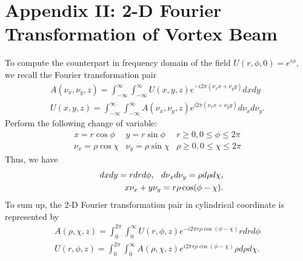 \section*{Appendix II: 2-D Fourier Transformation of Vortex Beam}
To compute the counterpart in frequency domain of the field $U(r, \phi, 0) = e^{i\phi}$, we recall the Fourier transformation pair
\begin{eqnarray}
	A(\nu_x, \nu_y, z) = \int_{-\infty}^{\infty} \int_{-\infty}^{\infty} U(x, y, z)
	e^{-i 2 \pi (\nu_x x + \nu_y y)} dx dy
	\nonumber\\
	U(x, y, z) = \int_{-\infty}^{\infty} \int_{-\infty}^{\infty} A(\nu_x, \nu_y, z)
	e^{i 2 \pi (\nu_x x + \nu_y y)} d\nu_x d\nu_y.
	\nonumber
\end{eqnarray}
Perform the following change of variable:
\begin{eqnarray}
	x = r\cos\phi & y = r\sin\phi & r \ge 0, 0 \le \phi \le 2\pi
	\nonumber\\
	\nu_x = \rho\cos\chi & \nu_y = \rho\sin\chi & \rho \ge 0, 0 \le \chi \le 2\pi
	\nonumber
\end{eqnarray}
Thus, we have
\begin{eqnarray}
	&&dx dy = r dr d\phi, \hspace{0.1in} d\nu_x d\nu_y = \rho d\rho d\chi,
	\nonumber\\
	&&x\nu_x + y\nu_y = r\rho \cos(\phi - \chi).
	\nonumber
\end{eqnarray}
To sum up, the 2-D Fourier transformation pair in cylindrical coordinate is represented by
\begin{eqnarray}
	A(\rho, \chi, z) = \int_{0}^{2\pi} \int_{0}^{\infty} U(r, \phi, z)
	e^{-i 2 \pi r \rho \cos(\phi - \chi)} r dr d\phi
	\nonumber\\
	U(r, \phi, z) = \int_{0}^{2\pi} \int_{0}^{\infty} A(\rho, \chi, z)
	e^{i 2 \pi r \rho \cos(\phi - \chi)} \rho d\rho d\chi.
	\nonumber
\end{eqnarray}


